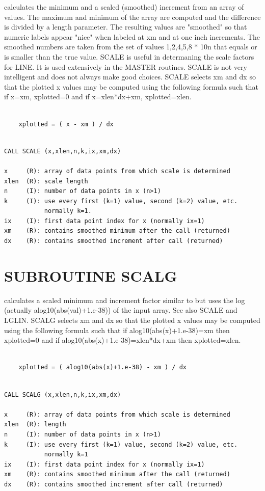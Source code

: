 \documentclass[11pt]{report}
\begin{document}
 calculates the minimum and a scaled (smoothed) increment from
an array of values.  The maximum and minimum of the array are computed
and the difference is divided by a length parameter.  The resulting
values are "smoothed" so that numeric labels appear "nice" when
labeled at xm and at one inch increments.  The smoothed numbers are
taken from the set of values 1,2,4,5,8 * 10n that equals or is smaller
than the true value.  SCALE is useful in determaning the scale factors
for LINE.  It is used extensively in the MASTER routines.  SCALE is
not very intelligent and does not always make good choices.  SCALE
selects xm and dx so that the plotted x values may be computed using
the following formula such that if x=xm, xplotted=0 and if
x=xlen*dx+xm, xplotted=xlen.
\begin{verbatim}

    xplotted = ( x - xm ) / dx

\end{verbatim}
\begin{verbatim}

CALL SCALE (x,xlen,n,k,ix,xm,dx)

x     (R): array of data points from which scale is determined
xlen  (R): scale length
n     (I): number of data points in x (n>1)
k     (I): use every first (k=1) value, second (k=2) value, etc.
           normally k=1.
ix    (I): first data point index for x (normally ix=1)
xm    (R): contains smoothed minimum after the call (returned)
dx    (R): contains smoothed increment after call (returned)
\end{verbatim}

\section{SUBROUTINE SCALG}

 calculates a scaled minimum and increment factor similar
to  but uses the log (actually alog10(abs(val)+1.e-38))
of the input array.  See also SCALE and LGLIN.
SCALG selects xm and dx so that the plotted
x values may be computed using the following formula such that if
alog10(abs(x)+1.e-38)=xm then xplotted=0 and if 
alog10(abs(x)+1.e-38)=xlen*dx+xm then xplotted=xlen.
\begin{verbatim}

    xplotted = ( alog10(abs(x)+1.e-38) - xm ) / dx

\end{verbatim}
\begin{verbatim}

CALL SCALG (x,xlen,n,k,ix,xm,dx)

x     (R): array of data points from which scale is determined
xlen  (R): length 
n     (I): number of data points in x (n>1)
k     (I): use every first (k=1) value, second (k=2) value, etc.
           normally k=1
ix    (I): first data point index for x (normally ix=1)
xm    (R): contains smoothed minimum after the call (returned)
dx    (R): contains smoothed increment after call (returned)
\end{verbatim}
\end{document}
